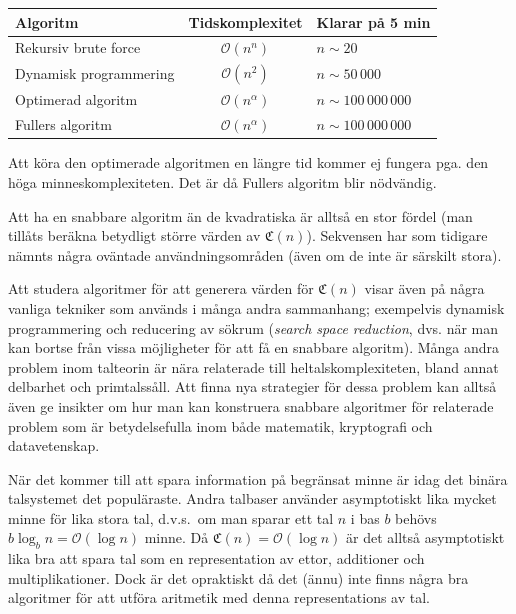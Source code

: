 \documentclass[a4paper,titlepage]{article}
\newcommand{\C}[1]{\mathfrak C \left( #1 \right)}
\renewcommand{\O}{\mathcal {O}}
\theoremstyle{definition}
\begin{document}
        \begin{table}[H]
        \begin{tabular}[pos]{|l | c | l |}
            \hline
            \textbf{Algoritm}       & \textbf{Tidskomplexitet} &  \textbf{Klarar på 5 min}\\ \hline
            Rekursiv brute force    & $\O(n^n)$      & $n\sim20$ \\ \hline
            Dynamisk programmering  & $\O(n^2)$      & $n\sim50\,000$ \\ \hline
            Optimerad algoritm      & $\O(n^\alpha)$ & $n\sim100\,000\,000$ \\ \hline
            Fullers algoritm       & $\O(n^\alpha)$ & $n\sim100\,000\,000$ \\ \hline
        \end{tabular}
        \end{table}
        
        \noindent
        Att köra den optimerade algoritmen en längre tid kommer ej fungera
        pga. den höga minneskomplexiteten. Det är då Fullers algoritm blir
        nödvändig. 
        
        Att ha en snabbare algoritm än de kvadratiska är alltså en stor fördel
        (man tillåts beräkna betydligt större värden av $\C{n}$). Sekvensen har
        som tidigare nämnts några oväntade användningsområden (även om de inte är
        särskilt stora).

        Att studera algoritmer för att generera värden för $\C{n}$ visar
        även på några vanliga tekniker som används i många andra sammanhang;
        exempelvis dynamisk programmering och reducering av sökrum (\emph{search
        space reduction}, dvs. när man kan bortse från vissa möjligheter för att
        få en snabbare algoritm). Många andra problem inom talteorin är nära
        relaterade till heltalskomplexiteten, bland annat delbarhet och primtalssåll.
        Att finna nya strategier för dessa problem kan alltså även ge
        insikter om hur man kan konstruera snabbare algoritmer för relaterade
        problem som är betydelsefulla inom både matematik, kryptografi och
        datavetenskap. 

        När det kommer till att spara information på begränsat minne är idag det
        binära talsystemet det populäraste. Andra talbaser använder
        asymptotiskt lika mycket minne för lika stora tal, d.v.s.\ om man sparar
        ett tal $n$ i bas $b$ behövs $b\log_b n = \O(\log n)$ minne. Då $\C{n} =
        \O(\log n)$ är det alltså asymptotiskt lika bra att spara tal som en
        representation av ettor, additioner och multiplikationer. Dock är det
        opraktiskt då det (ännu) inte finns några bra algoritmer för att utföra
        aritmetik med denna representations av tal.
\end{document}
